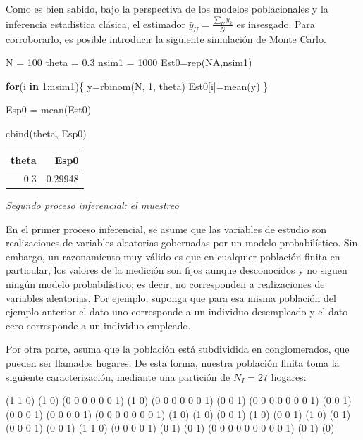 \documentclass[
  12pt,
]{book}
\newenvironment{Shaded}{\begin{snugshade}}{\end{snugshade}}
\newcommand{\ConstantTok}[1]{\textcolor[rgb]{0.00,0.00,0.00}{#1}}
\newcommand{\ControlFlowTok}[1]{\textcolor[rgb]{0.13,0.29,0.53}{\textbf{#1}}}
\newcommand{\DecValTok}[1]{\textcolor[rgb]{0.00,0.00,0.81}{#1}}
\newcommand{\FloatTok}[1]{\textcolor[rgb]{0.00,0.00,0.81}{#1}}
\newcommand{\FunctionTok}[1]{\textcolor[rgb]{0.00,0.00,0.00}{#1}}
\newcommand{\NormalTok}[1]{#1}
\newcommand{\OtherTok}[1]{\textcolor[rgb]{0.56,0.35,0.01}{#1}}
\newcommand{\SpecialCharTok}[1]{\textcolor[rgb]{0.00,0.00,0.00}{#1}}
\begin{document}
Como es bien sabido, bajo la perspectiva de los modelos poblacionales y la inferencia estadística clásica, el estimador \(\bar{y}_U = \frac{\sum_U y_k}{N}\) es insesgado. Para corroborarlo, es posible introducir la siguiente simulación de Monte Carlo.

\begin{Shaded}
\begin{Highlighting}[]
\NormalTok{N }\OtherTok{=} \DecValTok{100}
\NormalTok{theta }\OtherTok{=} \FloatTok{0.3}
\NormalTok{nsim1 }\OtherTok{=} \DecValTok{1000}
\NormalTok{Est0}\OtherTok{=}\FunctionTok{rep}\NormalTok{(}\ConstantTok{NA}\NormalTok{,nsim1)}

\ControlFlowTok{for}\NormalTok{(i }\ControlFlowTok{in} \DecValTok{1}\SpecialCharTok{:}\NormalTok{nsim1)\{}
\NormalTok{y}\OtherTok{=}\FunctionTok{rbinom}\NormalTok{(N, }\DecValTok{1}\NormalTok{, theta)}
\NormalTok{Est0[i]}\OtherTok{=}\FunctionTok{mean}\NormalTok{(y)}
\NormalTok{\}}

\NormalTok{Esp0 }\OtherTok{=} \FunctionTok{mean}\NormalTok{(Est0)}

\FunctionTok{cbind}\NormalTok{(theta, Esp0)  }
\end{Highlighting}
\end{Shaded}

\begin{tabular}{r|r}
\hline
theta & Esp0\\
\hline
0.3 & 0.29948\\
\hline
\end{tabular}

\emph{Segundo proceso inferencial: el muestreo}

En el primer proceso inferencial, se asume que las variables de estudio son realizaciones de variables aleatorias gobernadas por un modelo probabilístico. Sin embargo, un razonamiento muy válido es que en cualquier población finita en particular, los valores de la medición son fijos aunque desconocidos y no siguen ningún modelo probabilístico;
es decir, no corresponden a realizaciones de variables aleatorias. Por ejemplo, suponga que para esa misma población del ejemplo anterior el dato uno corresponde a un individuo desempleado y el dato cero corresponde a un individuo empleado.

Por otra parte, asuma que la población está subdividida en conglomerados, que pueden ser llamados hogares. De esta forma, nuestra población finita toma la siguiente caracterización, mediante una partición de \(N_{I}=27\) hogares:

(1 1 0) (1 0) (0 0 0 0 0 0 1) (1 0) (0 0 0 0 0 0 1) (0 0
1) (0 0 0 0 0 0 0 1) (0 0 1) (0 0 0 1) (0 0 0 0 1) (0 0
0 0 0 0 0 1) (1 0) (1 0) (0 0 1) (1 0) (0 0 1) (1 0) (0 1)
(0 0 0 1) (0 0 1) (1 1 0) (0 0 0 0 1) (0 1) (0 1) (0 0 0 0
0 0 0 0 0 1) (0 1) (0)
\end{document}
